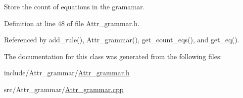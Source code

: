 Store the count of equations in the gramamar. 



Definition at line 48 of file Attr\_\-grammar.h.

Referenced by add\_\-rule(), Attr\_\-grammar(), get\_\-count\_\-eqs(), and get\_\-eq().

The documentation for this class was generated from the following files:\begin{CompactItemize}
\item 
include/Attr\_\-grammar/\hyperlink{Attr__grammar_8h}{Attr\_\-grammar.h}\item 
src/Attr\_\-grammar/\hyperlink{Attr__grammar_8cpp}{Attr\_\-grammar.cpp}\end{CompactItemize}
